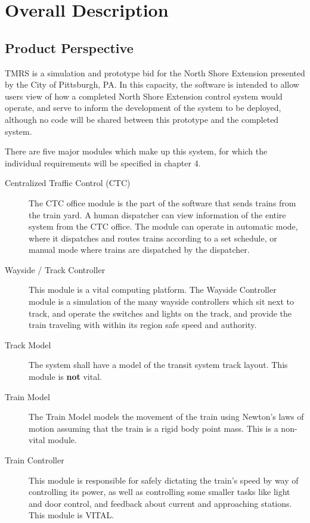 \documentclass{scrreprt}
\begin{document}

\chapter{Overall Description}

\section{Product Perspective}
TMRS is a simulation and prototype bid for the North Shore Extension presented by the City of Pittsburgh, PA.
In this capacity, the software is intended to allow users view of how a completed North Shore Extension control system would operate, and serve to inform the development of the system to be deployed, although no code will be shared between this prototype and the completed system.

There are five major modules which make up this system, for which the individual requirements will be specified in chapter 4.

\begin{description}
    \item[Centralized Traffic Control (CTC)] The CTC office module is the part of the software that sends trains from the train yard.
    A human dispatcher can view information of the entire system from the CTC office.
    The module can operate in automatic mode, where it dispatches and routes trains according to a set schedule, or manual mode where trains are dispatched by the dispatcher.
    \item[Wayside / Track Controller] This module is a vital computing platform.
    The Wayside Controller module is a simulation of the many wayside controllers which sit next to track, and operate the switches and lights on the track, and provide the train traveling with within its region safe speed and authority.
    \item[Track Model] The system shall have a model of the transit system track layout. This module is \textbf{not} vital.
    \item[Train Model] The Train Model models the movement of the train using Newton's laws of motion
    assuming that the train is a rigid body point mass. This is a non-vital module.
    \item[Train Controller] This module is responsible for safely dictating the train's speed by way of controlling its power, as well as controlling some smaller tasks like light and door control, and feedback about current and approaching stations. This module is VITAL.
\end{description}
\end{document}
